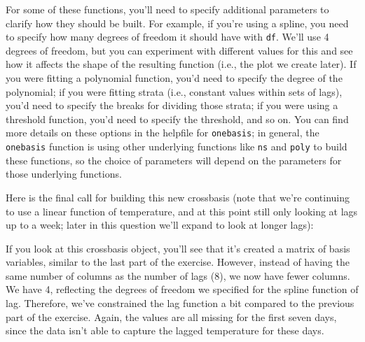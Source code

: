 \documentclass[
]{book}
\newenvironment{Shaded}{\begin{snugshade}}{\end{snugshade}}
\newcommand{\DataTypeTok}[1]{\textcolor[rgb]{0.13,0.29,0.53}{#1}}
\newcommand{\DecValTok}[1]{\textcolor[rgb]{0.00,0.00,0.81}{#1}}
\newcommand{\KeywordTok}[1]{\textcolor[rgb]{0.13,0.29,0.53}{\textbf{#1}}}
\newcommand{\NormalTok}[1]{#1}
\newcommand{\OperatorTok}[1]{\textcolor[rgb]{0.81,0.36,0.00}{\textbf{#1}}}
\newcommand{\StringTok}[1]{\textcolor[rgb]{0.31,0.60,0.02}{#1}}
\begin{document}
For some of these functions, you'll need to specify additional parameters to clarify
how they should be built. For example, if you're using a spline, you need to specify
how many degrees of freedom it should have with \texttt{df}. We'll use 4 degrees of freedom,
but you can experiment with different values for this and see how it affects the shape
of the resulting function (i.e., the plot we create later). If you were fitting a
polynomial function,
you'd need to specify the degree of the polynomial; if you were fitting strata (i.e.,
constant values within sets of lags), you'd need to specify the breaks for dividing
those strata; if you were using a threshold function, you'd need to specify the threshold,
and so on. You can find more details on these options in the helpfile for \texttt{onebasis};
in general, the \texttt{onebasis} function is using other underlying functions like \texttt{ns} and
\texttt{poly} to build these functions, so the choice of parameters will depend on the parameters
for those underlying functions.

Here is the final call for building this new crossbasis (note that we're continuing to
use a linear function of temperature, and at this point still only looking at lags up to
a week; later in this question we'll expand to look at longer lags):

\begin{Shaded}
\end{Shaded}

If you look at this crossbasis object, you'll see that it's created a matrix of basis
variables, similar to the last part of the exercise. However, instead of having the same
number of columns as the number of lags (8), we now have fewer columns. We have 4, reflecting
the degrees of freedom we specified for the spline function of lag. Therefore, we've
constrained the lag function a bit compared to the previous part of the exercise. Again,
the values are all missing for the first seven days, since the data isn't able to capture
the lagged temperature for these days.
\end{document}
